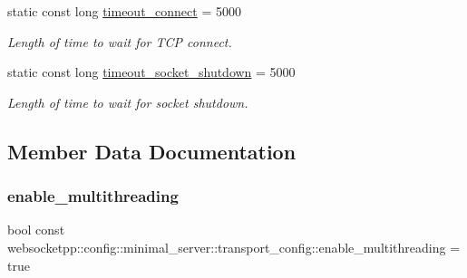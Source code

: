 \begin{DoxyCompactItemize}
\mbox{\label{structwebsocketpp_1_1config_1_1minimal__server_1_1transport__config_addfe5947be3138e84b1773b5be2ad49c}} 
static const long \mbox{\hyperlink{structwebsocketpp_1_1config_1_1minimal__server_1_1transport__config_addfe5947be3138e84b1773b5be2ad49c}{timeout\+\_\+connect}} = 5000
\begin{DoxyCompactList}\small\item\em Length of time to wait for T\+CP connect. \end{DoxyCompactList}\item 
\mbox{\label{structwebsocketpp_1_1config_1_1minimal__server_1_1transport__config_a100202545acd0d397d0462eb87e61b6c}} 
static const long \mbox{\hyperlink{structwebsocketpp_1_1config_1_1minimal__server_1_1transport__config_a100202545acd0d397d0462eb87e61b6c}{timeout\+\_\+socket\+\_\+shutdown}} = 5000
\begin{DoxyCompactList}\small\item\em Length of time to wait for socket shutdown. \end{DoxyCompactList}\end{DoxyCompactItemize}


\subsection{Member Data Documentation}
\mbox{\label{structwebsocketpp_1_1config_1_1minimal__server_1_1transport__config_a5103f390ba217818bc49b2509650c04a}} 
\subsubsection{\texorpdfstring{enable\+\_\+multithreading}{enable\_multithreading}}
{\footnotesize\ttfamily bool const websocketpp\+::config\+::minimal\+\_\+server\+::transport\+\_\+config\+::enable\+\_\+multithreading = true\hspace{0.3cm}{\ttfamily [static]}}

